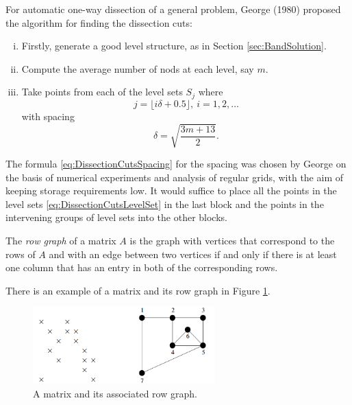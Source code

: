 \begin{alg}
  For automatic one-way dissection of a general problem, George (1980)
  proposed the algorithm for finding the dissection cuts:
  \begin{enumerate}[(i)]
  \item  Firstly, generate a good level structure, as in Section \ref{sec:BandSolution}.
  \item Compute the average number of nods at each level, say $m$.
  \item Take points from each of the level sets $S_j$ where
    \begin{equation}
      \label{eq:DissectionCutsLevelSet}
      j=\lfloor i\delta+0.5\rfloor,\ i=1,2,\ldots
    \end{equation}with spacing
    \begin{equation}
      \label{eq:DissectionCutsSpacing}
      \delta=\sqrt{\frac{3m+13}{2}}.
    \end{equation}
  \end{enumerate}
  The formula \eqref{eq:DissectionCutsSpacing} for the spacing was
  chosen by George on the basis of numerical experiments and analysis
  of regular grids, with the aim of keeping storage requirements
  low. It would suffice to place all the points in the level sets
  \eqref{eq:DissectionCutsLevelSet} in the last block and the points
  in the intervening groups of level sets into the other blocks.
\end{alg}

\begin{defn}
  The \emph{row graph} of a matrix $A$ is the graph with vertices that
  correspond to the rows of $A$ and with an edge between two vertices
  if and only if there is at least one column that has an entry in
  both of the corresponding rows.
\end{defn}

\begin{exm}
  There is an example of a matrix and its row graph in Figure \ref{fig:RowGraph}.
  \begin{figure}[H]
    \centering
    \includegraphics[width=7cm]{png/RowGraph.png}
    \caption{A matrix and its associated row graph.}
    \label{fig:RowGraph}
  \end{figure}
\end{exm}
 
